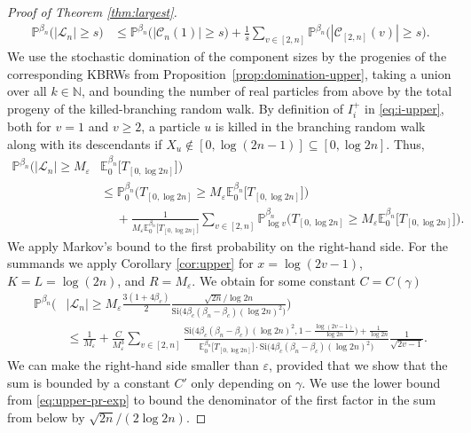 \documentclass[a4paper, a4wide, 10pt, reqno]{amsart}
\theoremstyle{plain}
\theoremstyle{definition}
\numberwithin{equation}{section}
\newcommand{\N}{{\mathbb N}}
\newcommand{\E}{\mathbb E}
\newcommand{\Prob}{\mathbb{P}}
\newcommand{\sC}{{\mathscr C}}
\newcommand{\sL}{{\mathscr L}}
\newcommand{\Si}{{\mathrm{Si}}}
\begin{document}
\begin{proof}[Proof of Theorem \ref{thm:largest}]
    \[
    \begin{aligned}
    \Prob^{\beta_n}\big(|\sL_{n}|\ge s\big) &\le \Prob^{\beta_n}\big(|\sC_{n}(1)|\ge s\big)+\frac{1}{s}\sum_{v\in[2,n]}\Prob^{\beta_n}\Big(|\sC_{[2,n]}(v)| \ge s\Big).
    \end{aligned}
    \]
	We use the stochastic domination of the component sizes by the progenies of the corresponding KBRWs from Proposition~\ref{prop:domination-upper}, taking a union over all $k\in\N$, and bounding the number of real particles from above by the total progeny of the killed-branching random walk. By definition of $I_i^+$ in \eqref{eq:i-upper}, both for $v=1$ and $v\ge2$, a particle $u$ is killed in the branching random walk along with its descendants if $X_u\notin[0, \log(2n-1)]\subseteq[0, \log 2n]$. Thus, 
    \[
    \begin{aligned}
\Prob^{\beta_n}\Big(|\sL_n|\ge M_\varepsilon &\E_0^{\beta_n}\big[T_{[0, \log 2n]}]\Big) \\&\le 
    \Prob_0^{\beta_n}\bigg(T_{[0, \log 2n]}\ge M_\varepsilon \E_0^{\beta_n}\big[T_{[0, \log 2n]}]\bigg) \\
    &\hspace{15pt}+ \frac{1}{M_\varepsilon \E_0^{\beta_n}\big[T_{[0, \log 2n]}\big]}\sum_{v\in[2,n]}\Prob_{\log v}^{\beta_n}\bigg(T_{[0, \log 2n]}\ge M_\varepsilon \E_0^{\beta_n}\big[T_{[0, \log 2n]}]\bigg).
    \end{aligned}
\]
We apply Markov's bound to the first probability on the right-hand side. For the summands we apply Corollary \ref{cor:upper} for $x=\log (2v-1)$, $K=L=\log (2n)$, and $R=M_\varepsilon$. We obtain for some constant $C=C(\gamma)$
\begin{equation}\label{eq:upper-largest-pr2}
\begin{aligned}
\Prob^{\beta_n}\bigg(&|\sL_n| \ge M_\varepsilon \frac{3(1+4\beta_c)}{2}\frac{\sqrt{2n}/\log 2n}{\Si\big(4\beta_c(\beta_n-\beta_c)(\log 2n)^2\big)}\bigg)\\ &\le \frac{1}{M_\varepsilon} + \frac{C}{M_\varepsilon^3}\sum_{v\in[2,n]}\frac{\Si\big(4\beta_c(\beta_n-\beta_c)(\log 2n)^2, 1- \frac{\log(2v-1)}{\log 2n}\big) + \frac{1}{\log 2n}}{\E_0^{\beta_n}\big[T_{[0, \log 2n]}\big]\cdot \Si\big(4\beta_c(\beta_n-\beta_c)(\log 2n)^2\big)}\frac{1}{\sqrt{2v-1}}.
\end{aligned}
\end{equation}
We can make the right-hand side smaller than $\varepsilon$, provided that we show that the sum is bounded by a constant $C'$ only depending on $\gamma$. We use the lower bound from \eqref{eq:upper-pr-exp} to bound the denominator of the first factor in the sum from below by $\sqrt{2n}/(2 \log 2n)$. 

\end{proof}
\end{document}
